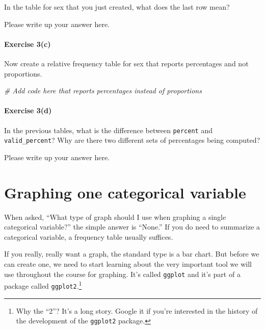 \documentclass[
]{book}
\newenvironment{Shaded}{\begin{snugshade}}{\end{snugshade}}
\newcommand{\CommentTok}[1]{\textcolor[rgb]{0.56,0.35,0.01}{\textit{#1}}}
\begin{document}
In the table for sex that you just created, what does the last row mean?

Please write up your answer here.

\hypertarget{exercise-3c}{%
\paragraph*{Exercise 3(c)}\label{exercise-3c}}

Now create a relative frequency table for sex that reports percentages and not proportions.

\begin{Shaded}
\begin{Highlighting}[]
\CommentTok{\# Add code here that reports percentages instead of proportions}
\end{Highlighting}
\end{Shaded}

\hypertarget{exercise-3d}{%
\paragraph*{Exercise 3(d)}\label{exercise-3d}}

In the previous tables, what is the difference between \texttt{percent} and \texttt{valid\_percent}? Why are there two different sets of percentages being computed?

Please write up your answer here.

\hypertarget{categorical-graphing-one}{%
\section{Graphing one categorical variable}\label{categorical-graphing-one}}

When asked, ``What type of graph should I use when graphing a single categorical variable?'' the simple answer is ``None.'' If you do need to summarize a categorical variable, a frequency table usually suffices.

If you really, really want a graph, the standard type is a bar chart. But before we can create one, we need to start learning about the very important tool we will use throughout the course for graphing. It's called \texttt{ggplot} and it's part of a package called \texttt{ggplot2}.\footnote{Why the ``2''? It's a long story. Google it if you're interested in the history of the development of the \texttt{ggplot2} package.}
\end{document}

